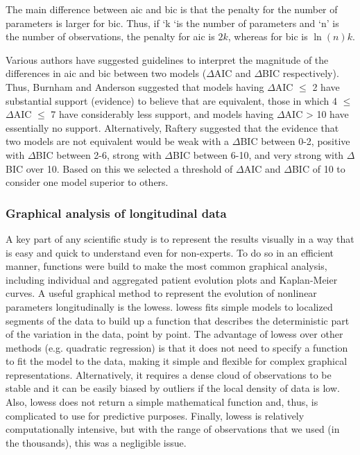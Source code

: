 The main difference between \gls{aic} and \gls{bic} is that the penalty for the number of parameters is larger for \gls{bic}. Thus, if ‘k ‘is the number of parameters and ‘n’ is the number of observations, the penalty for \gls{aic} is $2k$, whereas for \gls{bic} is $\ln(n)k$.

Various authors have suggested guidelines to interpret the magnitude of the differences in \gls{aic} and \gls{bic} between two models ($\Delta$AIC and $\Delta$BIC respectively). Thus, Burnham and Anderson\cite{Burnham2004} suggested that models having $\Delta$AIC $\leq$ 2 have substantial support (evidence) to believe that are equivalent, those in which 4 $\leq$ $\Delta$AIC $\leq$ 7 have considerably less support, and models having $\Delta$AIC > 10 have essentially no support. Alternatively, Raftery\cite{Raftery1995} suggested that the evidence that two models are not equivalent would be weak with a $\Delta$BIC between 0-2, positive with $\Delta$BIC between 2-6, strong with $\Delta$BIC between 6-10, and very strong with $\Delta$BIC over 10. Based on this we selected a threshold of $\Delta$AIC and $\Delta$BIC of 10 to consider one model superior to others.

\subsubsection{Graphical analysis of longitudinal data}
A key part of any scientific study is to represent the results visually in a way that is easy and quick to understand even for non-experts. To do so in an efficient manner, functions were build to make the most common graphical analysis, including individual and aggregated patient evolution plots and Kaplan-Meier curves. A useful graphical method to represent the evolution of nonlinear parameters longitudinally is the \gls{lowess}. \gls{lowess} fits simple models to localized segments of the data to build up a function that describes the deterministic part of the variation in the data, point by point.
The advantage of \gls{lowess} over other methods (e.g. quadratic regression) is that it does not need to specify a function to fit the model to the data, making it simple and flexible for complex graphical representations. Alternatively, it requires a dense cloud of observations to be stable and it can be easily biased by outliers if the local density of data is low. Also, \gls{lowess} does not return a simple mathematical function and, thus, is complicated to use for predictive purposes. Finally, \gls{lowess} is relatively computationally intensive, but with the range of observations that we used (in the thousands), this was a negligible issue.

